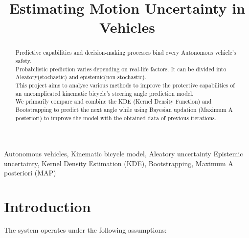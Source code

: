 \documentclass[conference]{IEEEtran}
\begin{document}
\title{Estimating Motion Uncertainty in Vehicles\\
}

\author{

}

\maketitle

\begin{abstract}
Predictive capabilities and decision-making processes bind every Autonomous vehicle's safety.\\ Probabilistic prediction varies depending on real-life factors. It can be divided into Aleatory(stochastic) and epistemic(non-stochastic). \\
This project aims to analyse various methods to improve the protective capabilities of an uncomplicated kinematic bicycle's steering angle prediction model.\\
We primarily compare and combine the KDE (Kernel Density Function) and Bootstrapping to predict the next angle while using Bayesian updation (Maximum A posteriori) to improve the model with the obtained data of previous iterations.
\end{abstract}

\begin{IEEEkeywords}
Autonomous vehicles, Kinematic bicycle model, Aleatory uncertainty
Epistemic uncertainty, Kernel Density Estimation (KDE),
Bootstrapping, Maximum A posteriori (MAP)
\end{IEEEkeywords}

\section{Introduction}
The system operates under the following assumptions:
\end{document}
